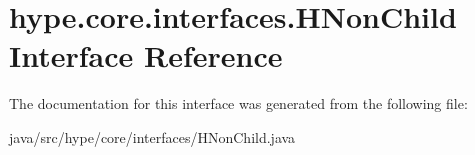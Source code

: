 \hypertarget{interfacehype_1_1core_1_1interfaces_1_1_h_non_child}{\section{hype.\-core.\-interfaces.\-H\-Non\-Child Interface Reference}
\label{interfacehype_1_1core_1_1interfaces_1_1_h_non_child}
}


The documentation for this interface was generated from the following file\-:\begin{DoxyCompactItemize}
\item 
java/src/hype/core/interfaces/H\-Non\-Child.\-java\end{DoxyCompactItemize}
